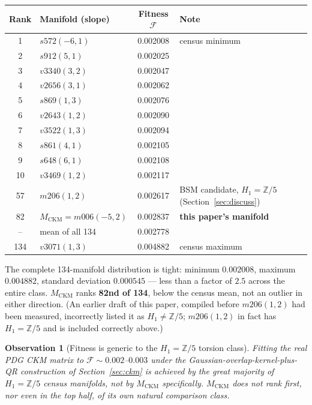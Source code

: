 \documentclass[11pt,a4paper]{article}
\newtheorem{observation}[theorem]{Observation}
\theoremstyle{remark}
\newcommand{\MCKM}{M_{\mathrm{CKM}}}
\newcommand{\Zfive}{\mathbb{Z}/5}
\begin{document}
\begin{center}
{\small
\begin{tabular}{clcl}
\toprule
Rank & Manifold (slope) & Fitness $\mathcal{F}$ & Note \\
\midrule
1  & $s572(-6,1)$ & 0.002008 & census minimum \\
2  & $s912(5,1)$  & 0.002025 & \\
3  & $v3340(3,2)$ & 0.002047 & \\
4  & $v2656(3,1)$ & 0.002062 & \\
5  & $s869(1,3)$  & 0.002076 & \\
6  & $v2643(1,2)$ & 0.002090 & \\
7  & $v3522(1,3)$ & 0.002094 & \\
8  & $s861(4,1)$  & 0.002105 & \\
9  & $s648(6,1)$  & 0.002108 & \\
10 & $v3469(1,2)$ & 0.002117 & \\
\midrule
57 & $m206(1,2)$ & 0.002617 & BSM candidate, $H_1=\Zfive$ (Section~\ref{sec:discuss}) \\
82 & $\MCKM = m006(-5,2)$ & 0.002837 & \textbf{this paper's manifold} \\
\midrule
--  & mean of all 134 & 0.002778 & \\
134 & $v3071(1,3)$ & 0.004882 & census maximum \\
\bottomrule
\end{tabular}
}
\end{center}

The complete 134-manifold distribution is tight: minimum $0.002008$,
maximum $0.004882$, standard deviation $0.000545$ --- less than a factor
of $2.5$ across the entire class. $\MCKM$ ranks \textbf{82nd of 134},
below the census mean, not an outlier in either direction.
(An earlier draft of this paper, compiled before $m206(1,2)$ had been
measured, incorrectly listed it as $H_1 \neq \Zfive$; $m206(1,2)$ in fact
has $H_1 = \Zfive$ and is included correctly above.)

\begin{observation}[Fitness is generic to the $H_1 = \Zfive$ torsion class]
\label{obs:generic_fitness}
Fitting the real PDG CKM matrix to $\mathcal{F} \sim 0.002$--$0.003$ under
the Gaussian-overlap-kernel-plus-QR construction of Section~\ref{sec:ckm}
is achieved by the great majority of $H_1 = \Zfive$ census manifolds, not
by $\MCKM$ specifically. $\MCKM$ does not rank first, nor even in the top
half, of its own natural comparison class.
\end{observation}
\end{document}
